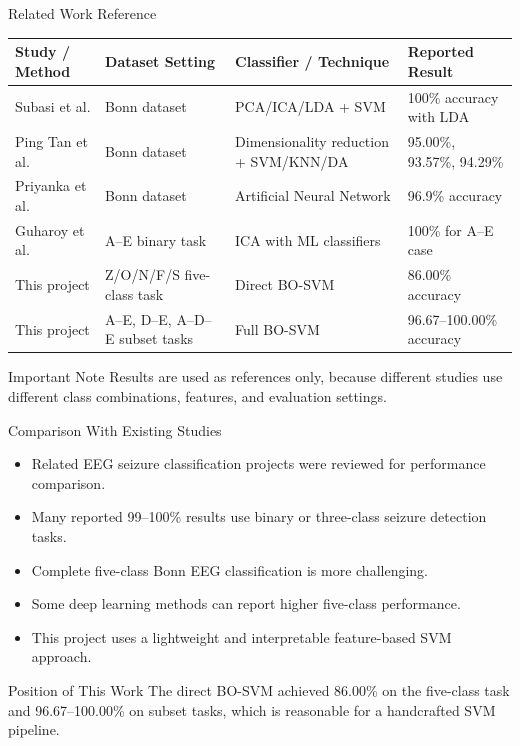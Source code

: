 \documentclass[10pt,aspectratio=169]{beamer}
\begin{document}
\begin{frame}{Related Work Reference}
  \begin{table}
    \centering
    \scriptsize
    \begin{tabular}{p{2.6cm}p{3.9cm}p{2.7cm}p{2.2cm}}
      \toprule
      Study / Method & Dataset Setting & Classifier / Technique & Reported Result \\
      \midrule
      Subasi et al. & Bonn dataset & PCA/ICA/LDA + SVM & 100\% accuracy with LDA \\
      Ping Tan et al. & Bonn dataset & Dimensionality reduction + SVM/KNN/DA & 95.00\%, 93.57\%, 94.29\% \\
      Priyanka et al. & Bonn dataset & Artificial Neural Network & 96.9\% accuracy \\
      Guharoy et al. & A--E binary task & ICA with ML classifiers & 100\% for A--E case \\
      This project & Z/O/N/F/S five-class task & Direct BO-SVM & 86.00\% accuracy \\
      This project & A--E, D--E, A--D--E subset tasks & Full BO-SVM & 96.67--100.00\% accuracy \\
      \bottomrule
    \end{tabular}
  \end{table}

  \begin{block}{Important Note}
    Results are used as references only, because different studies use different class combinations, features, and evaluation settings.
  \end{block}
\end{frame}

\begin{frame}{Comparison With Existing Studies}
  \begin{itemize}
    \item Related EEG seizure classification projects were reviewed for performance comparison.
    \item Many reported 99--100\% results use binary or three-class seizure detection tasks.
    \item Complete five-class Bonn EEG classification is more challenging.
    \item Some deep learning methods can report higher five-class performance.
    \item This project uses a lightweight and interpretable feature-based SVM approach.
  \end{itemize}

  \begin{block}{Position of This Work}
    The direct BO-SVM achieved 86.00\% on the five-class task and 96.67--100.00\% on subset tasks, which is reasonable for a handcrafted SVM pipeline.
  \end{block}
\end{frame}
\end{document}
